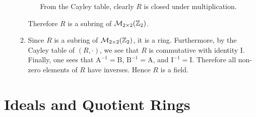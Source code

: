 \begin{enumerate}
\begin{enumerate}[label=(\roman*)]
\begin{itemize}
            From the Cayley table, clearly $R$ is closed under multiplication.
        \end{itemize}
        Therefore $R$ is a subring of $\mathcal{M}_{2\times2}(\mathbb{Z}_2)$.

        \item Since $R$ is a subring of $\mathcal{M}_{2\times2}(\mathbb{Z}_2)$, it is a ring. Furthermore, by the Cayley table of $(R, \cdot)$, we see that $R$ is commutative with identity I. Finally, one sees that $\mathrm{A}^{-1} = \mathrm{B}$, $\mathrm{B}^{-1} = \mathrm{A}$, and $\mathrm{I}^{-1} = \mathrm{I}$. Therefore all non-zero elements of $R$ have inverses. Hence $R$ is a field.
    \end{enumerate}
\end{enumerate}

\section{Ideals and Quotient Rings}
